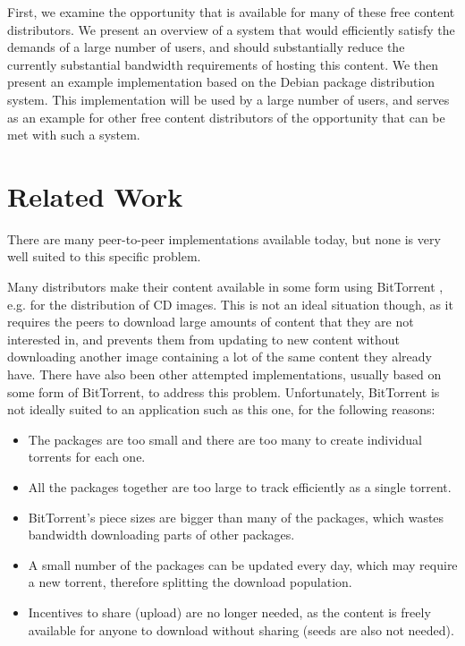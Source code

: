 \documentclass[conference]{IEEEtran}
\begin{document}
First, we examine the opportunity that is available for many of
these free content distributors. We present an overview of a system
that would efficiently satisfy the demands of a large number of
users, and should substantially reduce the currently substantial
bandwidth requirements of hosting this content. We then present an
example implementation based on the Debian package distribution
system. This implementation will be used by a large number of users,
and serves as an example for other free content distributors of the
opportunity that can be met with such a system.


\section{Related Work}
\label{related}

There are many peer-to-peer implementations available today, but
none is very well suited to this specific problem.

Many distributors make their content available in some form using
BitTorrent \cite{COHEN03}, e.g. for the distribution of CD
images. This is not an ideal situation though, as it requires the
peers to download large amounts of content that they are not
interested in, and prevents them from updating to new content
without downloading another image containing a lot of the same
content they already have. There have also been other attempted
implementations, usually based on some form of BitTorrent, to
address this problem. Unfortunately, BitTorrent is not ideally
suited to an application such as this one, for the following
reasons:
\begin{itemize}
 \item The packages are too small and there are too many to create
       individual torrents for each one.
 \item All the packages together are too large to track efficiently
       as a single torrent.
 \item BitTorrent's piece sizes are bigger than many of the
       packages, which wastes bandwidth downloading parts of other
       packages.
 \item A small number of the packages can be updated every day,
       which may require a new torrent, therefore splitting the
       download population.
 \item Incentives to share (upload) are no longer needed, as the
       content is freely available for anyone to download without
       sharing (seeds are also not needed).
\end{itemize}
\end{document}

